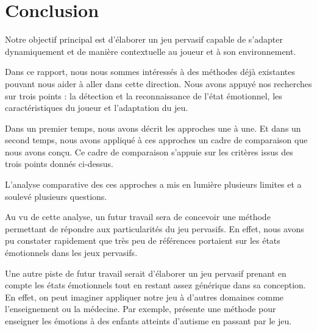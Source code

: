\documentclass{article}
\begin{document}
\section{Conclusion}
    Notre objectif principal est d'élaborer un jeu pervasif capable de s'adapter dynamiquement et de manière contextuelle au joueur et à son environnement.\par
    Dans ce rapport, nous nous sommes intéressés à des méthodes déjà existantes pouvant nous aider à aller dans cette direction.
    Nous avons appuyé nos recherches sur trois points : la détection et la reconnaissance de l'état émotionnel, les caractéristiques du joueur et l'adaptation du jeu.\par
    Dans un premier temps, nous avons décrit les approches une à une.
    Et dans un second temps, nous avons appliqué à ces approches un cadre de comparaison que nous avons conçu.
    Ce cadre de comparaison s'appuie sur les critères issus des trois points donnés ci-dessus.\par
    L'analyse comparative des ces approches a mis en lumière plusieurs limites et a soulevé plusieurs questions.\par
    Au vu de cette analyse, un futur travail sera de concevoir une méthode permettant de répondre aux particularités du jeu pervasifs. En effet, nous avons pu constater rapidement que très peu de références portaient sur les états émotionnels dans les jeux pervasifs.\par
    Une autre piste de futur travail serait d'élaborer un jeu pervasif prenant en compte les états émotionnels tout en restant assez générique dans sa conception. 
    En effet, on peut imaginer appliquer notre jeu à d'autres domaines comme l'enseignement ou la médecine. 
    Par exemple, \cite{grossard_et_al._2017} présente une méthode pour enseigner les émotions à des enfants atteints d'autisme en passant par le jeu.

\newpage
\appendix
\renewcommand{\appendixpagename}{Annexes}\appendixpage
\end{document}
